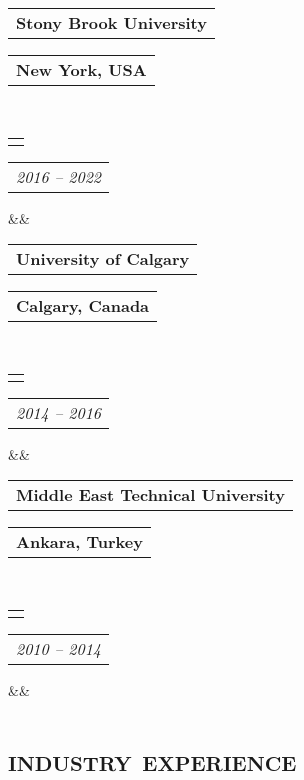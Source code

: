\documentclass[12pt,letter,roman]{moderncv}        %
\makeatletter
\newcommand*{\customcventry}[7][.25em]{
  \begin{tabular}{@{}l} 
    {\bfseries #4}
  \end{tabular}
  \hfill%
  \begin{tabular}{l@{}}
     {\bfseries #5}
  \end{tabular} \\
  \begin{tabular}{@{}l} 
    {{\color{airforceblue}{\textbf{#3}}}}
  \end{tabular}
  \hfill%
  \begin{tabular}{l@{}}
     {\itshape #2}
  \end{tabular}
  \ifx&#7&%
  \else{\\%
    \begin{minipage}{\maincolumnwidth}%
      \small#7%
    \end{minipage}}\fi%
  \par\addvspace{#1}}
\makeatother
\begin{document}
{\customcventry{2016 -- 2022}{Ph.D. in Computational Linguistics}{Stony Brook University}{New York, USA}{}{}


{\customcventry{2014 -- 2016}{M.A. in Linguistics}{University of Calgary}{Calgary, Canada}{}{}

{\customcventry{2010 -- 2014}{B.A. in English Language Teaching}{Middle East Technical University}{Ankara, Turkey}{}{}


\vspace{-0.5em}


\section{{\LARGE{\textsc{industry experience}}}}

    
        \vspace{0.2em}

{\begin{itemize}


\end{itemize}}}}}
\end{document}
